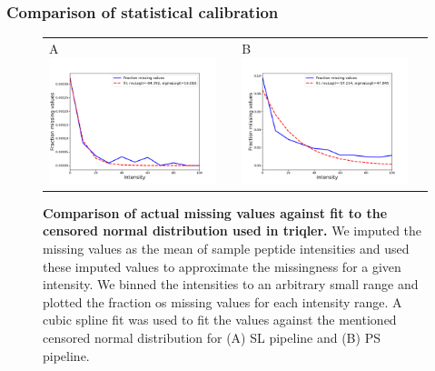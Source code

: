 \documentclass[11pt]{article}
\begin{document}
\subsubsection*{Comparison of statistical calibration}
\begin{figure}[hbt]
    \centering
    \centering
    \begin{tabular}{lclc} 
        A \includegraphics[width=0.5\linewidth]{../../result/report_plots_pipeline/fraction_missing_values_ID.png} & &%
        B \includegraphics[width=0.5\linewidth]{../../result/report_plots_pipeline/fraction_missing_values_PS.png} & \\%
    \end{tabular}
    \caption{{\bf Comparison of actual missing values against fit to the censored normal distribution used in triqler.} We imputed the missing values as the mean of sample peptide intensities and used these imputed values to approximate the missingness for a given intensity. We binned the intensities to an arbitrary small range and plotted the fraction os missing values for each intensity range. A cubic spline fit was used to fit the values against the mentioned censored normal distribution for (A) SL pipeline  and (B) PS pipeline. \label{fig:fraction_missing_values}}

\end{figure}
\end{document}
